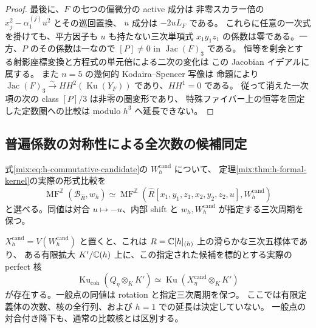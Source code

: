 \begin{proof}
最後に、$F$ の七つの偏微分の active 成分は
非零スカラー倍の $x_j^2-\alpha^{(j)}_1u^2$ とその巡回置換、
$u$ 成分は $-2uL_F$ である。
これらに任意の一次式を掛けても、平方因子も $u$ も持たない三次単項式
$x_1y_1z_1$ の係数は零である。一方、$P$ のその係数は一なので
$[P]\ne0$ in $\operatorname{Jac}(F)_3$ である。
恒等を剰余とする射影座標変換と方程式の単元倍による二次の変化は
この Jacobian イデアルに属する。
また $n=5$ の幾何的 Kodaira--Spencer 写像は
命題により
$\operatorname{Jac}(F)_3\xrightarrow{\sim}HH^2(\operatorname{Ku}(Y_F))$
であり、$HH^1=0$ である。
従って消えた一次項の次の class $[P]/3$ は非零の圏変形であり、
特殊ファイバー上の恒等を固定した定数圏への比較は modulo $h^3$ へ延長できない。
\end{proof}

\subsection{普遍係数の対称性による全次数の候補同定}

\begin{theorem}[同じ明示候補への全形式比較と一般点の核]
\label{mix:thm:h-exact-candidate}
式\eqref{mix:eq:h-commutative-candidate}の $W_h^{\mathrm{cand}}$ について、
定理\ref{mix:thm:h-formal-kernel}の実際の形式比較を
\begin{equation}\label{mix:eq:h-exact-formal-mf}
 \operatorname{MF}^{\mathbb Z}(\mathscr B_{\widehat R},w_h)
 \simeq
 \operatorname{MF}^{\mathbb Z}
       (\widehat R[x_1,y_1,z_1,x_2,y_2,z_2,u],W_h^{\mathrm{cand}})
\end{equation}
と選べる。同値は対合 $u\mapsto-u$、内部 shift と
$w_h,W_h^{\mathrm{cand}}$ が指定する三次周期を保つ。

$X_h^{\mathrm{cand}}=V(W_h^{\mathrm{cand}})$ と置くと、これは
$R=\mathbb C[h]_{(h)}$ 上の滑らかな三次五様体であり、
ある有限拡大 $K'/\mathbb C(h)$ 上に、この指定された候補を標的とする実際の perfect 核
\begin{equation}\label{mix:eq:h-exact-generic-ku}
 \operatorname{Ku}_{\mathrm{coh}}(Q_\eta\otimes_KK')
 \simeq\operatorname{Ku}(X_\eta^{\mathrm{cand}}\otimes_KK')
\end{equation}
が存在する。一般点の同値は rotation と指定三次周期を保つ。
ここでは有限定義体の次数、核の全行列、および $h=1$ での延長は決定していない。
一般点の対合付き降下も、通常の比較核とは区別する。
\end{theorem}

